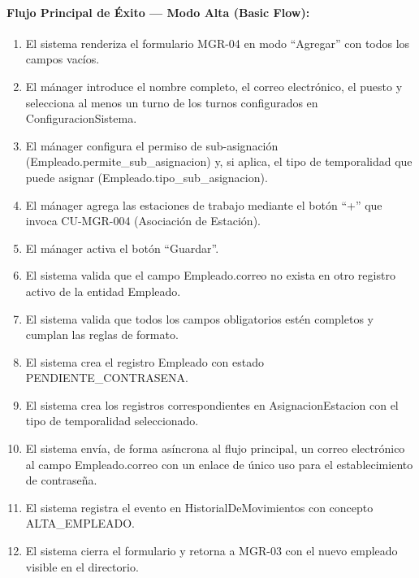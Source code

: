 \paragraph{Flujo Principal de Éxito --- Modo Alta (Basic Flow):}
\begin{enumerate}
    \item[I.] El sistema renderiza el formulario MGR-04 en modo ``Agregar'' con todos los campos vacíos.
    \item[II.] El mánager introduce el nombre completo, el correo electrónico, el puesto y selecciona al menos un turno de los turnos configurados en ConfiguracionSistema.
    \item[III.] El mánager configura el permiso de sub-asignación (Empleado.permite\_sub\_asignacion) y, si aplica, el tipo de temporalidad que puede asignar (Empleado.tipo\_sub\_asignacion).
    \item[IV.] El mánager agrega las estaciones de trabajo mediante el botón ``+'' que invoca CU-MGR-004 (Asociación de Estación).
    \item[V.] El mánager activa el botón ``Guardar''.
    \item[VI.] El sistema valida que el campo Empleado.correo no exista en otro registro activo de la entidad Empleado.
    \item[VII.] El sistema valida que todos los campos obligatorios estén completos y cumplan las reglas de formato.
    \item[VIII.] El sistema crea el registro Empleado con estado PENDIENTE\_CONTRASENA.
    \item[IX.] El sistema crea los registros correspondientes en AsignacionEstacion con el tipo de temporalidad seleccionado.
    \item[X.] El sistema envía, de forma asíncrona al flujo principal, un correo electrónico al campo Empleado.correo con un enlace de único uso para el establecimiento de contraseña.
    \item[XI.] El sistema registra el evento en HistorialDeMovimientos con concepto ALTA\_EMPLEADO.
    \item[XII.] El sistema cierra el formulario y retorna a MGR-03 con el nuevo empleado visible en el directorio.
\end{enumerate}

